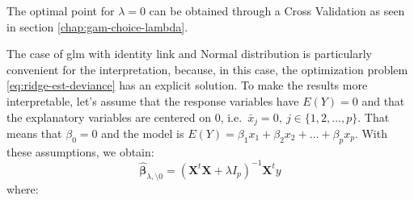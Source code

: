 \documentclass[a4paper, twoside, openright, 12pt]{report}
\let\origfigure\figure
\let\endorigfigure\endfigure
\renewenvironment{figure}[1][2] {
  \expandafter\origfigure\expandafter[!hbtp]
} {
  \endorigfigure
}
\theoremstyle{definition}
\theoremstyle{definition}
\theoremstyle{definition}
\theoremstyle{remark}
\begin{document}
The optimal point for \(\lambda=0\) can be obtained through a Cross Validation as seen in section \ref{chap:gam-choice-lambda}.







\begin{figure}[!hbtp]

{\centering {}\newline{}\newline{}

}

\caption[The Bias-Variance trade off. Ridge Regression coefficients for different levels of the penalization parameter \(\lambda\).]{Ridge Regression coefficients for different levels of the penalization parameter \(\lambda\). If \(\lambda=0\), the coefficients correspond to the maximum likelihood coefficients. As \(\lambda\) increases, the coefficients are shrunk towards \(0\).}\label{fig:ridge-lambda}
\end{figure}

The case of \ac{glm} with identity link and Normal distribution is particularly convenient for the interpretation, because, in this case, the optimization problem \eqref{eq:ridge-est-deviance} has an explicit solution. To make the results more interpretable, let's assume that the response variables have \(E(Y)=0\) and that the explanatory variables are centered on \(0\), i.e.~\(\bar{x}_j=0, \ j\in\{1,2,\dots,p\}\). That means that \(\beta_0=0\) and the model is \(E(Y)=\beta_1x_1+\beta_2x_2+\dots+\beta_px_p\). With these assumptions, we obtain:
\begin{equation}
\label{eq:ridge-estimator}
\hat{\boldsymbol{\beta}}_{\lambda,\setminus0} = \left(\boldsymbol{X}^t\boldsymbol{X}+\lambda I_p\right)^{-1}\boldsymbol{X}^t y
\end{equation}
where:
\end{document}
